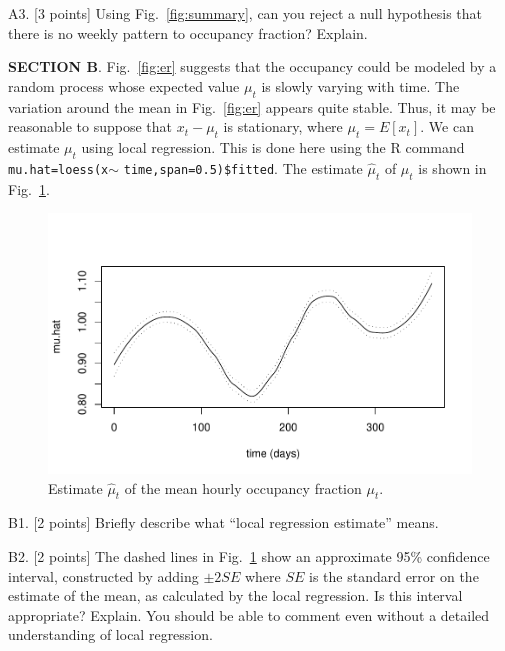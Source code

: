 \documentclass[12pt]{article}
\def\bc{\begin{center}}
\def\ec{\end{center}}
\def\qskip{\vspace{1.5in}}
\begin{document}
A3. [3 points] Using Fig.~\ref{fig:summary}, can you reject a null hypothesis that there is no weekly pattern to occupancy fraction? Explain.


\qskip

\vspace{2cm}

{\bf SECTION B}. 
Fig.~\ref{fig:er} suggests that the occupancy could be modeled by a random process whose expected value $\mu_t$ is slowly varying with time.
The variation around the mean in  Fig.~\ref{fig:er} appears quite stable.
 Thus, it may be reasonable to suppose that $x_t-\mu_t$ is stationary, where $\mu_t=E[x_t]$.
We can estimate $\mu_t$ %
using local regression. This is done here using the R command \texttt{mu.hat=loess(x}$ \sim$ \texttt{time,span=0.5)\$fitted}. The estimate $\hat \mu_t$ of $\mu_t$ is shown in Fig.~\ref{fig:smo}.
\begin{figure}[h]
\bc
\vspace{-1cm}
\includegraphics[width=4.5in]{ER-um-smo}
\vspace{-1cm}
\ec
\caption{Estimate $\hat\mu_t$ of the mean hourly occupancy fraction $\mu_t$.}\label{fig:smo}
\end{figure}

B1. [2 points] Briefly describe what ``local regression estimate'' means.

\qskip

\newpage

B2. [2 points] The dashed lines in Fig.~\ref{fig:smo} show an approximate 95\% confidence interval, constructed by adding $\pm 2SE$ where $SE$ is the standard error on the estimate of the mean, as calculated by the local regression. Is this interval appropriate? Explain. You should be able to comment even without a detailed understanding of local regression.
\end{document}
